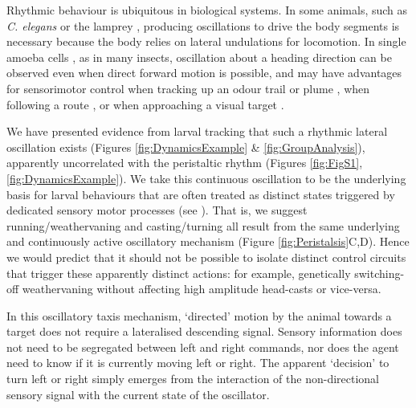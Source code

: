 \documentclass[11pt,a4paper]{article}
\begin{document}
 Rhythmic behaviour is ubiquitous in biological systems. In some animals, such as {\it C. elegans} \citep{iino2009parallel,izquierdo2010evolution,lockery2011computational}  or the lamprey  \citep{lansner1997realistic,wilson1999spikes}, producing oscillations to drive the body segments is necessary because the body relies on lateral undulations for locomotion.
 In single amoeba cells \citep{yangzigzag2011}, as in many insects, oscillation about a heading direction can be observed even when direct forward motion is possible, and may have advantages for sensorimotor control when tracking up an odour trail  \citep{hangartner1967german,farkas1972chemical} or plume \citep{budick2006free,belanger1996centrally,willis1997centrally,willis2008effects,carde2008navigational}  , when following a route \citep{lent2010image,kodzhabashev2015route}, or when approaching a visual target \citep{wallace1962experiments,philippides2013bumblebee,voss1998active}.

 We have presented evidence from larval tracking that such a rhythmic lateral oscillation exists (Figures \ref{fig:DynamicsExample} & \ref{fig:GroupAnalysis}), apparently uncorrelated with the peristaltic rhythm (Figures \ref{fig:FigS1},\ref{fig:DynamicsExample}).
We take this continuous oscillation to be the underlying basis for larval behaviours that are often treated as distinct states triggered by dedicated sensory motor processes (see \cite{green1983organization,sawin1994sensorimotor, cobbwhatandhow1999,vogelstein2014discovery, gomez2012active, gomez2014multilevel, hernandez2015reverse,gepner2015computations}).
 That is, we suggest running/weathervaning and casting/turning all result from the same underlying and continuously active oscillatory mechanism (Figure \ref{fig:Peristalsis}C,D).
  Hence we would predict that it should not be possible to isolate distinct control circuits that trigger these apparently distinct actions: for example, genetically switching-off weathervaning without affecting high amplitude head-casts or vice-versa.

In this oscillatory taxis mechanism, ‘directed’ motion by the animal towards a target does not require a lateralised descending signal. Sensory information does not need to be segregated between left and right commands, nor does the agent need to know if it is currently moving left or right. The apparent ‘decision’ to turn left or right simply emerges from the interaction of the non-directional sensory signal with the current state of the oscillator. 
\end{document}
